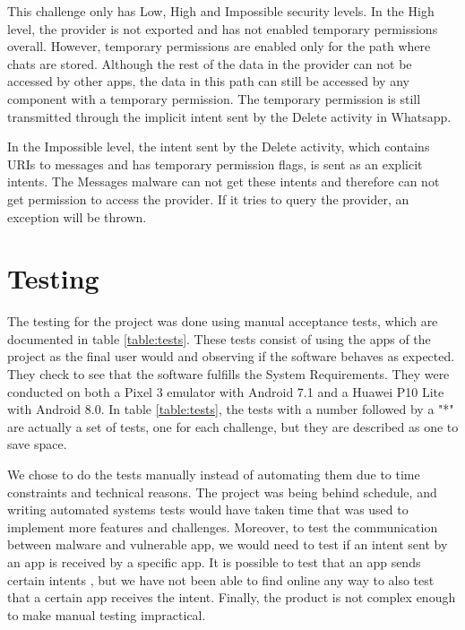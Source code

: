     This challenge only has Low, High and Impossible security levels. In the High level, the provider is not exported and has not enabled temporary permissions overall. However, temporary permissions are enabled only for the path where chats are stored. Although the rest of the data in the provider can not be accessed by other apps, the data in this path can still be accessed by any component with a temporary permission. The temporary permission is still transmitted through the implicit intent sent by the Delete activity in Whatsapp.
    
    In the Impossible level, the intent sent by the Delete activity, which contains URIs to messages and has temporary permission flags, is sent as an explicit intents. The Messages malware can not get these intents and therefore can not get permission to access the provider. If it tries to query the provider, an exception will be thrown.
    
    \section{Testing}
        \label{sec:testing}
        
    The testing for the project was done using manual acceptance tests, which are documented in table \ref{table:tests}. These tests consist of using the apps of the project as the final user would and observing if the software behaves as expected. They check to see that the software fulfills the System Requirements. They were conducted on both a Pixel 3 emulator with Android 7.1 and a Huawei P10 Lite with Android 8.0. In table \ref{table:tests}, the tests with a number followed by a "*" are actually a set of tests, one for each challenge, but they are described as one to save space.
    
    We chose to do the tests manually instead of automating them due to time constraints and technical reasons. The project was being behind schedule, and writing automated systems tests would have taken time that was used to implement more features and challenges. Moreover, to test the communication between malware and vulnerable app, we would need to test if an intent sent by an app is received by a specific app. It is possible to test that an app sends certain intents \cite{testing_intents}, but we have not been able to find online any way to also test that a certain app receives the intent. Finally, the product is not complex enough to make manual testing impractical.
    
